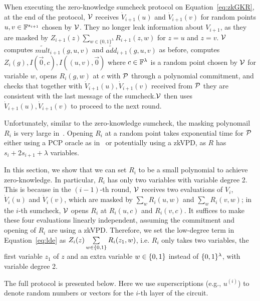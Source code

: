 When executing the zero-knowledge sumcheck protocol on Equation~\ref{eq:zkGKR}, at the end of the protocol, $\V$ receives $\dot{V}_{i+1}(u)$ and $\dot{V}_{i+1}(v)$ for random points $u,v\in\F^{s_{i+1}}$ chosen by $\V$. They no longer leak information about $V_{i+1}$, as they are masked by $Z_{i+1}(z)\sum\limits_{w \in \{0, 1\}^\lambda}R_{i+1}(z, w)$ for $z=u$ and $z=v$. $\V$ computes $\tilde{mult}_{i+1}(g,u,v)$ and $\tilde{add}_{i+1}(g,u,v)$ as before, computes $Z_i(g), I(\vec{0},c), I((u,v),\vec{0})$ where $c\in\F^\lambda$ is a random point chosen by $\V$ for variable $w$, opens $R_i(g,w)$ at $c$  with $\P$ through a polynomial commitment, and checks that together with $\dot{V}_{i+1}(u), \dot{V}_{i+1}(v)$ received from $\P$ they are consistent with the last message of the sumcheck.$\V$ then uses $\dot{V}_{i+1}(u), \dot{V}_{i+1}(v)$ to proceed to the next round.

Unfortunately, similar to the zero-knowledge sumcheck, the masking polynomail $R_i$ is very large in~\cite{zksumcheck}. Opening $R_i$ at a random point takes exponential time for $\P$ either using a PCP oracle as in~\cite{zksumcheck} or potentially using a zkVPD, as $R$ has $s_i+2s_{i+1}+\lambda$ variables.

In this section, we show that we can set $R_i$ to be a small polynomial to achieve zero-knowledge. In particular, $R_i$ has only two variables with variable degree 2. This is because in the $(i-1)$-th round, $\V$ receives two evaluations of $V_i$, $\dot{V}_i(u)$ and $\dot{V}_i(v)$,  which are masked by $\sum_{w}R_i(u,w)$ and $\sum_{w}R_i(v,w)$; in the $i$-th sumcheck, $\V$ opens $R_i$ at $R_i(u,c)$ and $R_i(v,c)$. It suffices to make these four evaluations linearly independent, assuming the commitment and opening of $R_i$ are using a zkVPD. Therefore, we set the low-degree term in Equation~\ref{eq:lde} as $Z_i(z)\sum\limits_{w \in\binary} R_i(z_1, w)$, i.e. $R_i$ only takes two variables, the first variable $z_1$ of $z$ and an extra variable $w\in\binary$ instead of $\binary^\lambda$, with variable degree 2. 

The full protocol is presented below. Here we use superscriptions (e.g., $u^{(i)}$) to denote random numbers or vectors for the $i$-th layer of the circuit.



